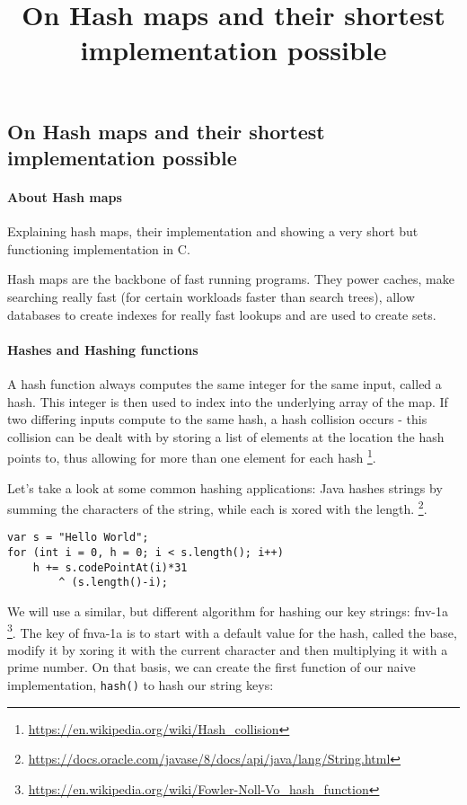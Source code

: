 

\title{On Hash maps and their shortest implementation possible}


    \subsection*{On Hash maps and their shortest implementation possible}

    \paragraph*{About Hash maps}

    Explaining hash maps, their implementation and showing a very short but
    functioning implementation in C.

    Hash maps are the backbone of fast running programs. They power
    caches, make searching really fast (for certain workloads faster than
    search trees), allow databases to create indexes for really fast
    lookups and are used to create sets.

    \paragraph*{Hashes and Hashing functions}

    A hash function always computes the same integer for the same input, called
    a hash. This integer is then used to index into the underlying array of the
    map. If two differing inputs compute to the same hash, a hash collision
    occurs - this collision can be dealt with by storing a list of elements at
    the location the hash points to, thus allowing for more than one element
    for each hash
    \footnote{\href{https://en.wikipedia.org/wiki/Hash_collision}{https://en.wikipedia.org/wiki/Hash\_collision}}.

    Let's take a look at some common hashing applications: Java hashes strings
    by summing the characters of the string, while each is xored with the
    length. 
    \footnote{\href{https://docs.oracle.com/javase/8/docs/api/java/lang/String.html\#hashCode}{https://docs.oracle.com/javase/8/docs/api/java/lang/String.html}}.
    \begin{verbatim}
var s = "Hello World";
for (int i = 0, h = 0; i < s.length(); i++)
    h += s.codePointAt(i)*31 
        ^ (s.length()-i);
    \end{verbatim}

    We will use a similar, but different algorithm for hashing our key strings:
    fnv-1a
    \footnote{\href{https://en.wikipedia.org/wiki/Fowler-Noll-Vo_hash_function}{https://en.wikipedia.org/wiki/Fowler-Noll-Vo\_hash\_function}}.
    The key of fnva-1a is to start with a default value for the hash, called
    the base, modify it by xoring it with the current character and then
    multiplying it with a prime number. On that basis, we can create the first
    function of our naive implementation, \texttt{hash()} to hash our string
    keys:


